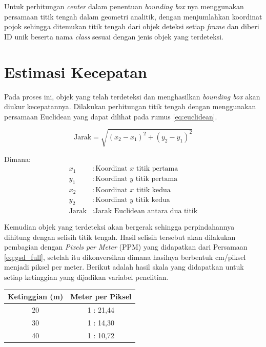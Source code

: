 Untuk perhitungan \emph{center} dalam penentuan \emph{bounding box} nya menggunakan persamaan titik tengah dalam geometri analitik, dengan menjumlahkan koordinat pojok sehingga ditemukan titik tengah dari objek deteksi setiap \emph{frame} dan diberi ID unik beserta nama \emph{class} sesuai dengan jenis objek yang terdeteksi.

\section{Estimasi Kecepatan}
Pada proses ini, objek yang telah terdeteksi dan menghasilkan \emph{bounding box} akan diukur kecepatannya. Dilakukan perhitungan titik tengah dengan menggunakan persamaan Euclidean yang dapat dilihat pada rumus \ref{eq:euclidean}.

\begin{equation}
  \label{eq:euclidean}
  \text{Jarak} = \sqrt{(x_2 - x_1)^2 + (y_2 - y_1)^2}
\end{equation}

\begin{flushleft}
Dimana:
\begin{align*}
x_1 & : \text{Koordinat $x$ titik pertama} \\
y_1 & : \text{Koordinat $y$ titik pertama} \\
x_2 & : \text{Koordinat $x$ titik kedua} \\
y_2 & : \text{Koordinat $y$ titik kedua} \\
\text{Jarak} & : \text{Jarak Euclidean antara dua titik}
\end{align*}
\end{flushleft}

Kemudian objek yang terdeteksi akan bergerak sehingga perpindahannya dihitung dengan selisih titik tengah. Hasil selisih tersebut akan dilakukan pembagian dengan \emph{Pixels per Meter} (PPM) yang didapatkan dari Persamaan \ref{eq:gsd_full}, setelah itu dikonversikan dimana hasilnya berbentuk cm/piksel menjadi piksel per meter. Berikut adalah hasil skala yang didapatkan untuk setiap ketinggian yang dijadikan variabel penelitian. 

\begin{table}[h!]
  \centering
  \label{tbl:skala_ppm}
  \begin{tabular}{|c|c|}
    \hline
    \rowcolor[gray]{0.9}
    \textbf{Ketinggian (m)} & \textbf{Meter per Piksel} \\ \hline
    20                      & 1 : 21,44                 \\ \hline
    30                      & 1 : 14,30                 \\ \hline
    40                      & 1 : 10,72                 \\ \hline
  \end{tabular}
\end{table}

